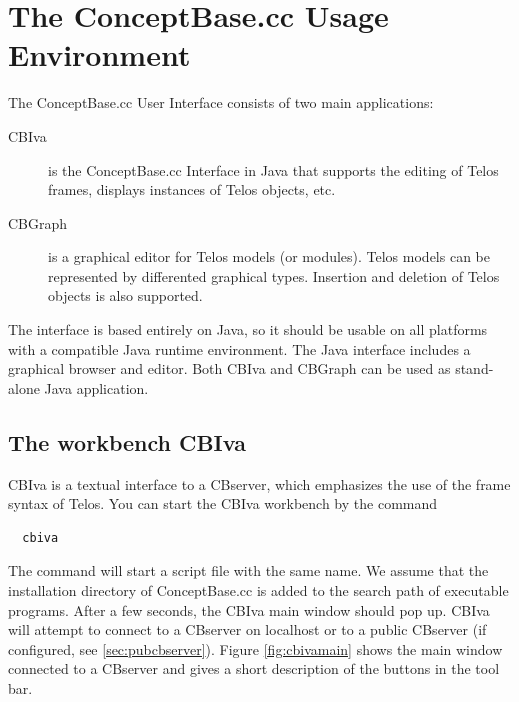 

\chapter{The ConceptBase.cc Usage Environment}
\label{cha:workbench}

The ConceptBase.cc User Interface consists of two main applications:

\begin{description}
\item[CBIva] is the ConceptBase.cc Interface in Java that supports
the editing of Telos frames, displays instances of Telos objects,
etc.
\item[CBGraph] is a graphical editor for Telos models (or modules). Telos models
can be represented by differented graphical types. Insertion and deletion
of Telos objects is also supported.
\end{description}

The interface is based entirely on Java, so it should be usable on all platforms
with a compatible Java runtime environment. The Java interface includes a graphical browser and editor.
Both CBIva and CBGraph can be used as stand-alone Java application.



\section{The workbench CBIva}

CBIva is a textual interface to a CBserver, which emphasizes the use of the frame syntax
of Telos.
You can start the CBIva workbench by the command

\begin{verbatim}
  cbiva
\end{verbatim}

The command will start a script file with the same name.
We assume that
 the installation directory of ConceptBase.cc is added to the search path
of executable programs. After a few seconds, the CBIva main
window should pop up. CBIva will attempt to connect to a CBserver on localhost or to
a public CBserver (if configured, see \ref{sec:pubcbserver}).
Figure \ref{fig:cbivamain} shows the main window connected
to a CBserver and gives a short description of the buttons in the tool bar.


